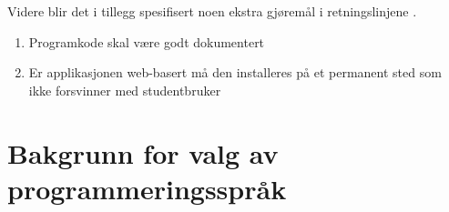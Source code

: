 Videre blir det i tillegg spesifisert noen ekstra gjøremål i retningslinjene \cite{midtbø}. 

\begin{enumerate}[resume]
    \item Programkode skal være godt dokumentert
    \item Er applikasjonen web-basert må den installeres på et permanent sted som ikke forsvinner med studentbruker
\end{enumerate}


\cite{Johanessen}

\section{Bakgrunn for valg av programmeringsspråk}